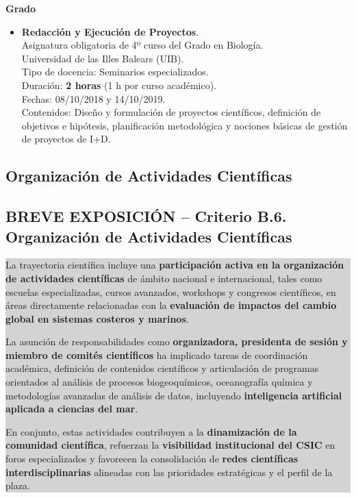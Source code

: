 \documentclass[11pt,a4paper]{article}
\newcommand{\breveexposicion}[2]{
    \subsection*{\color{darkgray}\textbf{BREVE EXPOSICIÓN -- #1}}
    \vspace{0.3em}
    \noindent\colorbox{lightgray}{%
        \begin{minipage}{0.97\textwidth}
        \vspace{0.5em}
        \color{darkgray}
        #2
        \vspace{0.5em}
        \end{minipage}
    }
    \vspace{1em}
}
\begin{document}
\textbf{Grado}

\begin{itemize}[leftmargin=*]

    \item \textbf{Redacción y Ejecución de Proyectos}.\\
    Asignatura obligatoria de 4º curso del Grado en Biología.\\
    Universidad de las Illes Balears (UIB).\\
    Tipo de docencia: Seminarios especializados.\\
    Duración: \textbf{2 horas} (1 h por curso académico).\\
    Fechas: 08/10/2018 y 14/10/2019.\\
    Contenidos: Diseño y formulación de proyectos científicos, definición de objetivos e hipótesis, planificación metodológica y nociones básicas de gestión de proyectos de I+D.

\end{itemize}


\subsection{Organización de Actividades Científicas}

\breveexposicion{Criterio B.6. Organización de Actividades Científicas}{
La trayectoria científica incluye una \textbf{participación activa en la organización de actividades científicas} de ámbito nacional e internacional, tales como escuelas especializadas, cursos avanzados, workshops y congresos científicos, en áreas directamente relacionadas con la \textbf{evaluación de impactos del cambio global en sistemas costeros y marinos}.

La asunción de responsabilidades como \textbf{organizadora, presidenta de sesión y miembro de comités científicos} ha implicado tareas de coordinación académica, definición de contenidos científicos y articulación de programas orientados al análisis de procesos biogeoquímicos, oceanografía química y metodologías avanzadas de análisis de datos, incluyendo \textbf{inteligencia artificial aplicada a ciencias del mar}.

En conjunto, estas actividades contribuyen a la \textbf{dinamización de la comunidad científica}, refuerzan la \textbf{visibilidad institucional del CSIC} en foros especializados y favorecen la consolidación de \textbf{redes científicas interdisciplinarias} alineadas con las prioridades estratégicas y el perfil de la plaza.
}
\end{document}
